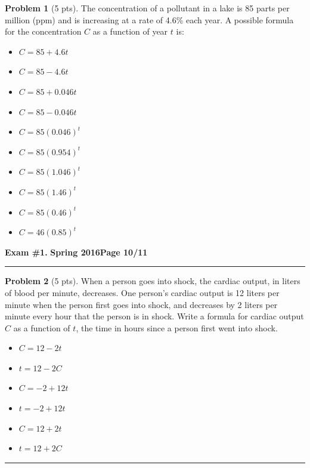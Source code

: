 \documentclass[12pt]{article}
\makeatletter
\theoremstyle{definition}
\newtheorem{problem}{Problem}
\newcommand*{\radiobutton}{%
  \@ifstar{\@radiobutton0}{\@radiobutton1}%
}
\newcommand*{\@radiobutton}[1]{%
  \begin{tikzpicture}
    \pgfmathsetlengthmacro\radius{height("X")/2}
    \draw[radius=\radius] circle;
    \ifcase#1 \fill[radius=.6*\radius] circle;\fi
  \end{tikzpicture}%
}
\makeatother
\begin{document}
\begin{problem}[5 pts]
The concentration of a pollutant in a lake is 85 parts per million (ppm) and is increasing at a rate of 4.6\% each year. A possible formula for the concentration $C$ as a function of year $t$ is:
\begin{itemize}
\item[\radiobutton] $C = 85 + 4.6t$
\item[\radiobutton] $C = 85 - 4.6t$
\item[\radiobutton] $C = 85 + 0.046t$
\item[\radiobutton] $C = 85 - 0.046t$
\item[\radiobutton] $C = 85(0.046)^t$
\item[\radiobutton] $C = 85(0.954)^t$
\item[\radiobutton] $C = 85(1.046)^t$
\item[\radiobutton] $C = 85(1.46)^t$
\item[\radiobutton] $C = 85(0.46)^t$
\item[\radiobutton] $C = 46(0.85)^t$
\end{itemize}
\end{problem}
\newpage

\hfill{\large\bf Exam \#1.}\hfill{\large\bf
  Spring 2016}\hfill{\large\bf Page 10/11}\hrule

\begin{problem}[5 pts]
When a person goes into shock, the cardiac output, in liters of blood per minute, decreases. One person’s cardiac output is 12 liters per minute when the person first goes into shock, and decreases by 2 liters per minute every hour that the person is in shock. Write a formula for cardiac output $C$ as a function of $t$, the time in hours since a person first went into shock.
\begin{itemize}
\item[\radiobutton] $C = 12 - 2t$
\item[\radiobutton] $t = 12 - 2C$
\item[\radiobutton] $C = -2 + 12t$
\item[\radiobutton] $t = -2 + 12t$
\item[\radiobutton] $C = 12 + 2t$
\item[\radiobutton] $t = 12 + 2C$
\end{itemize}
\end{problem}

\vspace{4cm}
\hrule
\end{document}
